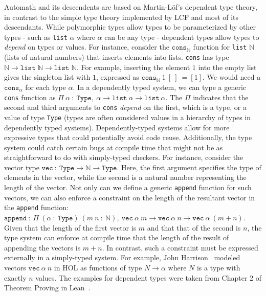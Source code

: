\documentclass{article}
\begin{document}
  	Automath and its descendents are 
  	based on Martin-L\"{o}f's dependent 
  	type theory, in contrast to the
  	simple type theory implemented by  
  	LCF and most of	its descendants. 
  	While polymorphic 
  	types allow types to be 
  	parameterized by other types 
  	 - such as \texttt{list}
  	$ \alpha$ where $\alpha$ can be 
  	any type - dependent types allow 
  	types to \textit{depend} on 
  	types or values. For instance, 
  	consider the 
  	$\texttt{cons}_{\mathbb{N}}$
  	function for \texttt{list} 
  	$\mathbb{N}$ (lists of natural 
  	numbers) that inserts elements into 
  	lists. \texttt{cons} has type 
  	$\mathbb{N}	\to \texttt{list } 
  	\mathbb{N} \to \texttt{list } 
  	\mathbb{N}$. For example, 
  	inserting the element $1$ into 
  	the empty list gives the 
  	singleton list with $1$, expressed
  	as $\texttt{cons}_{\mathbb{N}}\ 
  	1\ [\ ]\ = [1]$. We would need 
  	a $\texttt{cons}_{\alpha}$ for 
  	each type $\alpha$. In a 
  	dependently typed system, we can 
  	type a generic \texttt{cons} 
  	function as $\Pi\ \alpha\ :\ 
  	\texttt{Type},\ \alpha \to 
  	\texttt{list}\ \alpha \to 
  	\texttt{list}\ \alpha$. The 
  	$\Pi$ indicates that the 
  	second and third arguments 
  	to \texttt{cons} \textit{depend}
  	on the first, which is a type, 
  	or a value of type \texttt{Type} 
  	(types are often considered 
  	values in a hierarchy
  	of types in dependently typed 
  	systems). Dependently-typed 
  	systems allow for more expressive
  	types that could potentially 
  	avoid code reuse. Additionally, 
  	the type system could catch 
  	certain bugs at compile time
  	that might not be as 
  	straightforward to do with 
  	simply-typed checkers. For 
  	instance, consider the 
  	vector type $\texttt{vec}\ 
  	:\ \texttt{Type} \to \mathbb{N}
  	\to \texttt{Type}$. Here, the 
  	first argument specifies the 
  	type of elements in the vector, 
  	while the second is a natural 
  	number representing the 
  	length of the vector. Not 
  	only can we define a generic
  	\texttt{append} function for 
  	such vectors, we can also 
  	enforce a constraint on the 
  	length of the resultant vector
  	in the \texttt{append} function:
  	$\texttt{append}\ :\ \Pi\ 
  	(\alpha\ :\ \texttt{Type})\ 
  	(m\ n\ :\ \mathbb{N}),\ 
  	\texttt{vec}\ \alpha\ m \to 
  	\texttt{vec}\ \alpha\ n \to 
  	\texttt{vec}\ \alpha\ (m + n)$.
  	Given that the length of the 
  	first vector is $m$ and that 
  	that of the	second is $n$, the 
  	type system	can enforce at compile 
  	time that the length of the result 
  	of appending the vectors is 
  	$m + n$. In contrast, such a 
  	constraint 
  	must be expressed externally 
  	in a simply-typed system. For 
  	example, John 
  	Harrison~\cite{10.1007/11541868_8} 
  	modeled vectors $\texttt{vec}\ 
  	\alpha\ n$ in HOL as functions 
  	of type	$N \to \alpha$ where $N$ 
  	is a type with exactly $n$ values. 
  	The examples for dependent 
  	types were taken from 
  	Chapter 2 of Theorem Proving 
  	in Lean~\cite{avigad2016theorem}.
  
\end{document}
